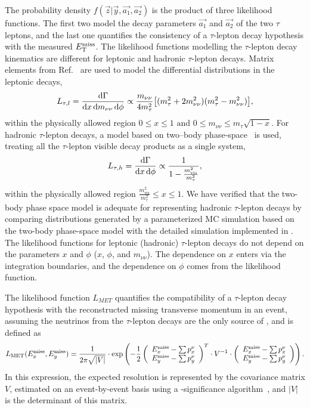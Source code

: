 \documentclass[12pt,twoside,a4paper,cmspaper,final,collab]{cms-tdr}
\begin{document}
The probability density $f(\vec{z} \vert \vec{y}, \vec{a_1}, \vec{a_2})$ is the product of three likelihood functions.
The first two model the decay parameters $\vec{a_1}$ and $\vec{a_2}$
of the two $\tau$ leptons, and the last
one quantifies the consistency of a $\tau$-lepton decay hypothesis with the measured $E_{\mathrm{T}}^{\text{miss}}$.
The likelihood functions modelling the $\tau$-lepton decay kinematics are different for leptonic and hadronic $\tau$-lepton decays.
Matrix elements from Ref.~\cite{TauPol} are used to model the differential distributions in the leptonic
decays,
\begin{equation}
L_{\tau,l} = \frac{\mathrm{d}\Gamma}{\mathrm{d} x\, \mathrm{d} m_{\nu\nu}\,\mathrm{d}\phi} \propto \frac{m_{\nu\nu}}{4m_{\tau}^2} \big[(m_{\tau}^2 +2m_{\nu\nu}^2 )(m_{\tau}^2 - m_{\nu\nu}^2)\big],
\label{eq:likelihoodLepTauDecay}
\end{equation}
within the physically allowed region $0 \leq x \leq 1 \mbox{ and } 0 \leq m_{\nu\nu} \leq m_{\tau}\sqrt{1-x}$.
For hadronic $\tau$-lepton decays, a model based on two--body phase-space~\cite{PDG} is used,
treating all the $\tau$-lepton visible decay products as a single system,
\begin{equation}
L_{\tau,h} = \frac{\mathrm{d}\Gamma}{\mathrm{d} x\,\mathrm{d}\phi} \propto \frac{1}{1- \frac{m^2_\text{vis}}{m^2_{\tau}}},
\label{eq:likelihoodHadTauDecay}
\end{equation}
within the physically allowed region $\frac{m_\text{vis}^{2}}{m_{\tau}^{2}} \leq x \leq 1$.
We have verified that the two-body phase space model is adequate for representing hadronic $\tau$-lepton decays
by comparing distributions generated by a parameterized MC simulation based on the two-body phase-space model
with the detailed simulation implemented in \TAUOLA.
The likelihood functions for leptonic (hadronic) $\tau$-lepton decays do not depend on the parameters $x$ and $\phi$ ($x$, $\phi$, and $m_{\nu\nu}$). The dependence on $x$ enters via the integration boundaries, and the dependence on $\phi$ comes from the \MET likelihood function.

The \MET likelihood function $L_{MET}$ quantifies the compatibility of a $\tau$-lepton decay hypothesis
with the reconstructed missing transverse momentum in an event,
assuming the neutrinos from the $\tau$-lepton decays are the only source of \MET, and is defined as
\begin{equation}
L_{\rm MET} (E_{x}^\text{miss}, E_{y}^\text{miss}) = \frac{1}{2 \pi \sqrt{\vert V \vert}}
\cdot \exp \left( -\frac{1}{2}
 \left( \begin{array}{c} E_{x}^\text{miss} - \sum p_{x}^{\nu} \\ E_{y}^\text{miss} - \sum p_{y}^{\nu} \end{array} \right)^{T}
\cdot V^{-1} \cdot
 \left( \begin{array}{c} E_{x}^\text{miss} - \sum p_{x}^{\nu} \\ E_{y}^\text{miss} - \sum p_{y}^{\nu} \end{array} \right)
\right).
\end{equation}
In this expression, the expected \MET resolution is represented by the covariance matrix $V$, estimated on an event-by-event basis using a
\MET-significance algorithm~\cite{PFMEtSignAlgo},
and $\vert V \vert$ is the determinant of this matrix.
\end{document}
